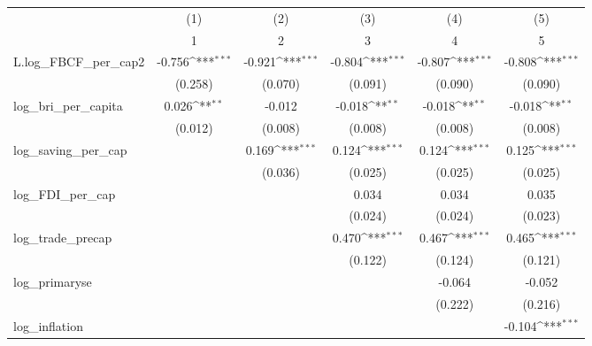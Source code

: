 {
\def\sym#1{\ifmmode^{#1}\else\(^{#1}\)\fi}
\begin{tabular}{l*{5}{c}}
\toprule
            &\multicolumn{1}{c}{(1)}&\multicolumn{1}{c}{(2)}&\multicolumn{1}{c}{(3)}&\multicolumn{1}{c}{(4)}&\multicolumn{1}{c}{(5)}\\
            &\multicolumn{1}{c}{1}&\multicolumn{1}{c}{2}&\multicolumn{1}{c}{3}&\multicolumn{1}{c}{4}&\multicolumn{1}{c}{5}\\
\midrule
L.log\_FBCF\_per\_cap2&      -0.756\sym{***}&      -0.921\sym{***}&      -0.804\sym{***}&      -0.807\sym{***}&      -0.808\sym{***}\\
            &     (0.258)         &     (0.070)         &     (0.091)         &     (0.090)         &     (0.090)         \\
\addlinespace
log\_bri\_per\_capita&       0.026\sym{**} &      -0.012         &      -0.018\sym{**} &      -0.018\sym{**} &      -0.018\sym{**} \\
            &     (0.012)         &     (0.008)         &     (0.008)         &     (0.008)         &     (0.008)         \\
\addlinespace
log\_saving\_per\_cap&                     &       0.169\sym{***}&       0.124\sym{***}&       0.124\sym{***}&       0.125\sym{***}\\
            &                     &     (0.036)         &     (0.025)         &     (0.025)         &     (0.025)         \\
\addlinespace
log\_FDI\_per\_cap&                     &                     &       0.034         &       0.034         &       0.035         \\
            &                     &                     &     (0.024)         &     (0.024)         &     (0.023)         \\
\addlinespace
log\_trade\_precap&                     &                     &       0.470\sym{***}&       0.467\sym{***}&       0.465\sym{***}\\
            &                     &                     &     (0.122)         &     (0.124)         &     (0.121)         \\
\addlinespace
log\_primaryse&                     &                     &                     &      -0.064         &      -0.052         \\
            &                     &                     &                     &     (0.222)         &     (0.216)         \\
\addlinespace
log\_inflation&                     &                     &                     &                     &      -0.104\sym{***}\\

\end{tabular}}
